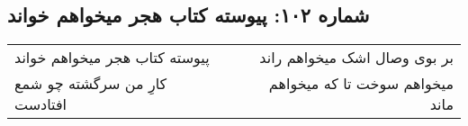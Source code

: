 \begin{center}
\section*{شماره ۱۰۲: پیوسته کتاب هجر میخواهم خواند}
\label{sec:102}
\begin{longtable}{l p{0.5cm} r}
پیوسته کتاب هجر میخواهم خواند
&&
بر بوی وصال اشک میخواهم راند
\\
کارِ من سرگشته چو شمع افتادست
&&
میخواهم سوخت تا که میخواهم ماند
\\
\end{longtable}
\end{center}

